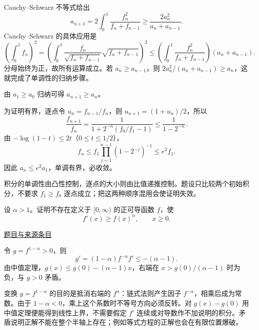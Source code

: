 \documentclass[12pt,fontset=fandol]{ctexart}
\begin{document}
\begin{solve}\label{ans:pre08-math:4}

Cauchy--Schwarz 不等式给出
\[
a_{n+1}=2\int_0^1\frac{f_n^2}{f_n+f_{n-1}}
\ge\frac{2a_n^2}{a_n+a_{n-1}}.
\]
Cauchy--Schwarz 的具体应用是
\[
\left(\int_0^1 f_n\right)^2
=\left(\int_0^1\frac{f_n}{\sqrt{f_n+f_{n-1}}}\sqrt{f_n+f_{n-1}}\right)^2
\le\left(\int_0^1\frac{f_n^2}{f_n+f_{n-1}}\right)(a_n+a_{n-1}).
\]
分母始终为正，故所有运算成立。若 $a_n\ge a_{n-1}$，则 $2a_n^2/(a_n+a_{n-1})\ge a_n$，这就完成了单调性的归纳步骤。

由 $a_1\ge a_0$ 归纳可得 $a_{n+1}\ge a_n$。

为证明有界，逐点令 $u_n=f_{n-1}/f_n$，则 $u_{n+1}=(1+u_n)/2$，所以
\[
\frac{f_{n+1}}{f_n}
=\frac1{1+2^{-n}(f_0/f_1-1)}
\le\frac1{1-2^{-n}}.
\]
由 $-\log(1-t)\le2t$（$0\le t\le1/2$），
\[
f_n\le f_1\prod_{j=1}^{n-1}(1-2^{-j})^{-1}\le e^2 f_1.
\]
因此 $a_n\le e^2a_1$，单调有界，必收敛。

\end{solve}

\begin{remark}[方法与条件]积分的单调性由凸性控制，逐点的大小则由比值递推控制。题设只比较两个初始积分，不要求 $f_1\ge f_0$ 逐点成立；把这两种顺序混用会使证明失效。\end{remark}

\begin{example}[来源序号5]\label{ex:pre08-math:5}\label{pr:pre08-math:5}

设 $\alpha>1$。证明不存在定义于 $[0,\infty)$ 的正可导函数 $f$，使
\[
f'(x)\ge f(x)^\alpha,\qquad x\ge0.
\]

\par\href{https://github.com/lzxcr/cmc-mathematics/blob/64916fa1fdbc3e444a652eca204d5669058ee321/src/problems/preliminary/08/05.md}{题目与来源条目}

\end{example}

\begin{solve}\label{ans:pre08-math:5}

令 $g=f^{1-\alpha}>0$，则
\[
g'=(1-\alpha)f^{-\alpha}f'\le-(\alpha-1).
\]
由中值定理，$g(x)\le g(0)-(\alpha-1)x$，右端在 $x>g(0)/(\alpha-1)$ 时为负，与 $g>0$ 矛盾。

变换 $g=f^{1-\alpha}$ 的目的是抵消右端的 $f^\alpha$：链式法则产生因子 $f^{-\alpha}$，相乘后成为常数。由于 $1-\alpha<0$，乘上这个系数时不等号方向必须反转。对 $g(x)-g(0)$ 用中值定理便能得到线性上界，不需要假定 $f'$ 连续或对导数作不加说明的积分。矛盾说明正解不能在整个半轴上存在；例如等式方程的正解也会在有限位置爆破。

\end{solve}
\end{document}
